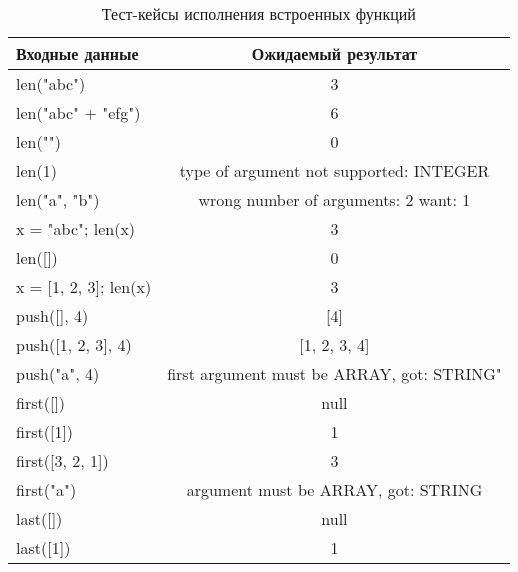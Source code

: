 \begin{table}[!ht]
    \Large
    \centering
    \begin{threeparttable}
        \caption{Тест-кейсы исполнения встроенных функций}
        \label{t:testCases_builtins}
        \begin{tabularx}{\textwidth}{|X|c|}
            \hline
            Входные данные            & Ожидаемый результат                        \\
            \hline
            len("abc")                & 3                                          \\
            \hline
            len("abc" + "efg")        & 6                                          \\
            \hline
            len("")                   & 0                                          \\
            \hline
            len(1)                    & type of argument not supported: INTEGER    \\
            \hline
            len("a", "b")             & wrong number of arguments: 2 want: 1       \\
            \hline
            x = "abc"; len(x)         & 3                                          \\
            \hline
            len({[}{]})               & 0                                          \\
            \hline
            x = {[}1, 2, 3{]}; len(x) & 3                                          \\
            \hline
            push({[}{]}, 4)           & {[}4{]}                                    \\
            \hline
            push({[}1, 2, 3{]}, 4)    & {[}1, 2, 3, 4{]}                           \\
            \hline
            push("a", 4)              & first argument must be ARRAY, got: STRING" \\
            \hline
            first({[}{]})             & null                                       \\
            \hline
            first({[}1{]})            & 1                                          \\
            \hline
            first({[}3, 2, 1{]})      & 3                                          \\
            \hline
            first("a")                & argument must be ARRAY, got: STRING        \\
            \hline
            last({[}{]})              & null                                       \\
            \hline
            last({[}1{]})             & 1                                          \\
            \hline
        \end{tabularx}
    \end{threeparttable}
    \vspace{\bottompaddingoftable}
\end{table}

